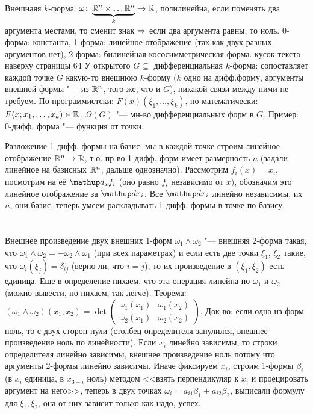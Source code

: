 \section{} %
Внешнаяя $k$-форма: $\omega \colon \underbrace{\mathbb{R}^n \times \dots \mathbb{R}^n}_{k} \to \mathbb{R}$, полилинейна, если поменять два аргумента
местами, то сменит знак $\Rightarrow$ если два аргумента равны, то ноль.
0-форма: константа, 1-форма: линейное отображение (так как двух разных аргументов нет), 2-форма: билинейная кососимметрическая форма.
\TODO кусок текста наверху страницы 64
У открытого $G \subseteq $ дифференциальная $k$-форма: сопоставляет каждой точке $G$ какую-то внешнюю $k$-форму ($k$ одно на дифф.форму, аргументы внешней формы "--- из $\mathbb{R}^n$, того же, что и $G$),
никакой связи между ними не требуем.
По-программистски: $F(x)(\xi_1, \dots, \xi_k)$, по-математически: $F(x; x_1, \dots, x_k) \in \mathbb{R}$.
$\Omega(G)$ "--- мн-во дифференциальных форм в $G$.
Пример: 0-дифф. форма "--- функция от точки.

Разложение 1-дифф. формы на базис: мы в каждой точке строим линейное отображение $\mathbb{R}^n \to \mathbb{R}$,
т.о. пр-во 1-дифф. форм имеет размерность $n$ (задали линейное на базисных $\mathbb{R}^n$, дальше однозначно).
Рассмотрим $f_i(x)=x_i$, посмотрим на её $\d_x f_i$ (оно равно $f_i$ независимо от $x)$, обозначим
это линейное отображение за $\d x_i$.
Все $\d x_i$ линейно независимы, их $n$, они базис, теперь умеем раскладывать 1-дифф. формы в точке по базису.

\section{} %
Внешнее произведение двух внешних 1-форм $\omega_1 \wedge \omega_2$ "--- внешняя 2-форма такая, что
$\omega_1 \wedge \omega_2 = -\omega_2 \wedge \omega_1$ (при всех параметрах) и если есть две точки $\xi_1$, $\xi_2$
такие, что $\omega_i(\xi_j) = \delta_{ij}$ (верно ли, что $i = j$), то их произведение в $(\xi_1, \xi_2)$ есть единица.
Еще в определение пихаем, что эта операция линейна по $\omega_1$ и $\omega_2$ (можно вывести, но пихаем, так легче).
Теорема: $(\omega_1 \wedge \omega_2)(x_1, x_2) = \det \begin{pmatrix} \omega_1(x_1) & \omega_1(x_2) \\ \omega_2(x_1) & \omega_2(x_2) \end{pmatrix}$.
Док-во: если одна из форм ноль, то с двух сторон нули (столбец определителя занулился, внешнее произведение ноль по линейности).
Если $x_i$ линейно зависимы, то строки определителя линейно зависимы, внешнее произведение ноль потому что аргументы 2-формы линейно зависимы.
Иначе фиксируем $x_i$, строим 1-формы $\beta_i$ (в $x_i$ единица, в $x_{3-i}$ ноль) методом <<взять перпендикуляр к $x_i$ и проецировать аргумент на него>>,
теперь в двух точках $\omega_i=a_{i1}\beta_1+a_{i2}\beta_2$, выписали формулу для $\xi_1, \xi_2$, она от них зависит только как надо, успех.

